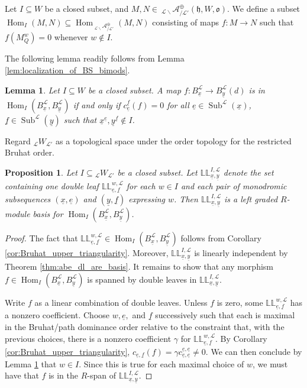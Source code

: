 \documentclass{amsart}
\newcommand{\scrL}{\mathcal{L}}
\DeclareMathOperator{\Hom}{Hom}
\newcommand{\fr}[1]{\mathfrak{#1}}
\newcommand{\dLL}{\mathbb{L}\mathbb{L}}
\newcommand{\Amon}[2]{\:_{#1 \backslash} \mathcal{A}_{/ #2} }
\DeclareMathOperator{\Subexp}{Sub}
\newcommand{\W}[2]{{}_{#1}W_{#2}}
\newcommand{\ue}{\underline{e}}
\newcommand{\uf}{\underline{f}}
\newcommand{\ux}{\underline{x}}
\newcommand{\uy}{\underline{y}}
\newtheorem{lemma}[subsubsection]{Lemma}
\newtheorem{proposition}[subsubsection]{Proposition}
\theoremstyle{definition}
\numberwithin{equation}{subsection}
\begin{document}
Let $I \subseteq W$ be a closed subset, and $M, N \in \Amon{\scrL}{\scrL'}^{\oplus} (\fr{h}, W, \fr{o})$.
We define a subset $\Hom_I (M,N) \subseteq \Hom_{\Amon{\scrL}{\scrL'}^{\oplus}} (M,N)$ consisting of maps $f : M \to N$ such that $f (M_Q^w) = 0$ whenever $w \notin I$.

The following lemma readily follows from Lemma \ref{lem:localization_of_BS_bimods}.
\begin{lemma}\label{lem:referaming_localization_support}
    Let $I \subseteq W$ be a closed subset.
    A map $f : B_{\ux}^{\scrL} \to B_{\uy}^{\scrL} (d)$ is in $\Hom_I ( B_{\ux}^{\scrL}, B_{\uy}^{\scrL})$ if and only if $c_{\ue}^{\uf} (f) = 0$ for all $\ue \in \Subexp^{\scrL} (\ux)$, $\uf \in \Subexp^{\scrL} (\uy)$ such that $\ux^{\ue}, \uy^{\uf} \notin I$.
\end{lemma}

Regard $\W{\scrL}{\scrL'}$ as a topological space under the order topology for the restricted Bruhat order.

\begin{proposition}\label{prop:ideal_Hom_spaces}
    Let $I \subseteq \W{\scrL}{\scrL'}$ be a closed subset.
    Let $\dLL_{\ux, \uy}^{I, \scrL}$ denote the set containing one double leaf $\dLL_{\ue, \uf}^{w, \scrL}$ for each $w \in I$ and each pair of monodromic subsequences $(\ux, \ue)$ and $(\uy, \uf)$ expressing $w$.
    Then $\dLL_{\ux, \uy}^{I, \scrL}$ is a left graded $R$-module basis for $\Hom_I (B_{\ux}^{\scrL}, B_{\uy}^{\scrL})$.
\end{proposition}
\begin{proof}
    The fact that $\dLL_{\ue, \uf}^{w, \scrL} \in \Hom_I (B_{\ux}^{\scrL}, B_{\uy}^{\scrL})$ follows from Corollary \ref{cor:Bruhat_upper_triangularity}.
    Moreover, $\dLL_{\ux, \uy}^{I, \scrL}$ is linearly independent by Theorem \ref{thm:abe_dl_are_basis}.
    It remains to show that any morphism $f \in \Hom_I (B_{\ux}^{\scrL}, B_{\uy}^{\scrL})$ is spanned by double leaves in $\dLL_{\ux, \uy}^{I, \scrL}$.

    Write $f$ as a linear combination of double leaves. Unless $f$ is zero, some $\dLL_{\ue, \uf}^{w, \scrL}$ has a nonzero coefficient.
    Choose $w, \ue,$ and $\uf$ successively such that each is maximal in the Bruhat/path dominance order relative to the constraint that, with the previous choices, there is a nonzero coefficient $\gamma$ for $\dLL_{\ue, \uf}^{w, \scrL}$.
    By Corollary \ref{cor:Bruhat_upper_triangularity}, $c_{\ue, \uf} (f) = \gamma c_{\ue, \ue}^{\ue, \ue} \neq 0$.
    We can then conclude by Lemma \ref{lem:referaming_localization_support} that $w \in I$.
    Since this is true for each maximal choice of $w$, we must have that $f$ is in the $R$-span of $\dLL_{\ux, \uy}^{I, \scrL}$.
\end{proof}
\end{document}
